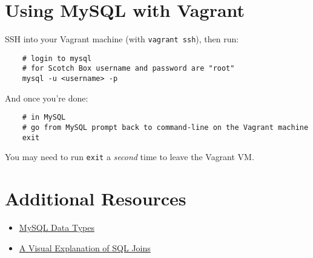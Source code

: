 \section{Using MySQL with Vagrant}

SSH into your Vagrant machine (with \texttt{vagrant ssh}), then run:

\begin{verbatim}
    # login to mysql
    # for Scotch Box username and password are "root"
    mysql -u <username> -p
\end{verbatim}

And once you're done:

\begin{verbatim}
    # in MySQL
    # go from MySQL prompt back to command-line on the Vagrant machine
    exit
\end{verbatim}

You may need to run \texttt{exit} a \textit{second} time to leave the Vagrant VM.

\section{Additional Resources}

\begin{itemize}[leftmargin=*]
    \item \href{https://dev.mysql.com/doc/refman/5.7/en/data-types.html}{MySQL Data Types}
    \item \href{https://blog.codinghorror.com/a-visual-explanation-of-sql-joins/}{A Visual Explanation of SQL Joins}
\end{itemize}
